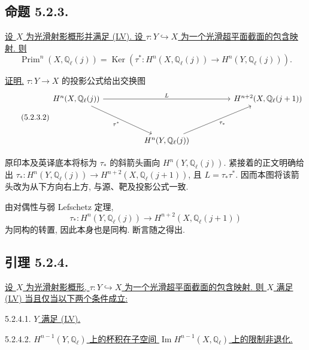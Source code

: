 \subsection*{命题 5.2.3.}
\underline{设 $X$ 为光滑射影概形并满足 (LV). 设 $\tau:Y\hookrightarrow X$ 为一个光滑超平面截面的包含映射. 则}
\begin{equation}\tag{5.2.3.1}
\operatorname{Prim}^n(X,\mathbb Q_\ell(j))
=\operatorname{Ker}\!\left(
\tau^*:H^n(X,\mathbb Q_\ell(j))
\longrightarrow H^n(Y,\mathbb Q_\ell(j))
\right).
\end{equation}

\underline{证明.}
$\tau:Y\to X$ 的投影公式给出交换图
\begin{equation}\tag{5.2.3.2}
\begin{tikzcd}[column sep=huge,row sep=huge]
H^n(X,\mathbb Q_\ell(j))
  \arrow[rr,"L"]\arrow[dr,"\tau^*"']
  & {} &
H^{n+2}(X,\mathbb Q_\ell(j+1))
\\
{} & H^n(Y,\mathbb Q_\ell(j)) \arrow[ur,"\tau_*"'] & {}
\end{tikzcd}
\end{equation}
\begin{editorialnote}
原印本及英译底本将标为 $\tau_*$ 的斜箭头画向 $H^n(Y,\mathbb Q_\ell(j))$. 紧接着的正文明确给出 $\tau_*:H^n(Y,\mathbb Q_\ell(j))\to H^{n+2}(X,\mathbb Q_\ell(j+1))$, 且 $L=\tau_*\tau^*$. 因而本图将该箭头改为从下方向右上方, 与源、靶及投影公式一致.
\end{editorialnote}

由对偶性与弱 Lefschetz 定理,
\[
\tau_*:H^n(Y,\mathbb Q_\ell(j))
\longrightarrow H^{n+2}(X,\mathbb Q_\ell(j+1))
\]
为同构的转置, 因此本身也是同构. 断言随之得出.

\subsection*{引理 5.2.4.}
\underline{设 $X$ 为光滑射影概形, $\tau:Y\hookrightarrow X$ 为一个光滑超平面截面的包含映射. 则 $X$ 满足 (LV) 当且仅当以下两个条件成立:}

\smallskip
\noindent
\textup{5.2.4.1.} \underline{$Y$ 满足 (LV).}

\smallskip
\noindent
\textup{5.2.4.2.} \underline{$H^{n-1}(Y,\mathbb Q_\ell)$ 上的杯积在子空间 $\operatorname{Im}H^{n-1}(X,\mathbb Q_\ell)$ 上的限制非退化.}

